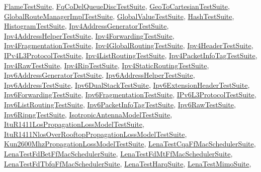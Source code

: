 \hyperlink{classFlameTestSuite}{Flame\+Test\+Suite}, \hyperlink{classFqCoDelQueueDiscTestSuite}{Fq\+Co\+Del\+Queue\+Disc\+Test\+Suite}, \hyperlink{classGeoToCartesianTestSuite}{Geo\+To\+Cartesian\+Test\+Suite}, \hyperlink{classGlobalRouteManagerImplTestSuite}{Global\+Route\+Manager\+Impl\+Test\+Suite}, \hyperlink{classGlobalValueTestSuite}{Global\+Value\+Test\+Suite}, \hyperlink{classHashTestSuite}{Hash\+Test\+Suite}, \hyperlink{classHistogramTestSuite}{Histogram\+Test\+Suite}, \hyperlink{classIpv4AddressGeneratorTestSuite}{Ipv4\+Address\+Generator\+Test\+Suite}, \hyperlink{classIpv4AddressHelperTestSuite}{Ipv4\+Address\+Helper\+Test\+Suite}, \hyperlink{classIpv4ForwardingTestSuite}{Ipv4\+Forwarding\+Test\+Suite}, \hyperlink{classIpv4FragmentationTestSuite}{Ipv4\+Fragmentation\+Test\+Suite}, \hyperlink{classIpv4GlobalRoutingTestSuite}{Ipv4\+Global\+Routing\+Test\+Suite}, \hyperlink{classIpv4HeaderTestSuite}{Ipv4\+Header\+Test\+Suite}, \hyperlink{classIPv4L3ProtocolTestSuite}{I\+Pv4\+L3\+Protocol\+Test\+Suite}, \hyperlink{classIpv4ListRoutingTestSuite}{Ipv4\+List\+Routing\+Test\+Suite}, \hyperlink{classIpv4PacketInfoTagTestSuite}{Ipv4\+Packet\+Info\+Tag\+Test\+Suite}, \hyperlink{classIpv4RawTestSuite}{Ipv4\+Raw\+Test\+Suite}, \hyperlink{classIpv4RipTestSuite}{Ipv4\+Rip\+Test\+Suite}, \hyperlink{classIpv4StaticRoutingTestSuite}{Ipv4\+Static\+Routing\+Test\+Suite}, \hyperlink{classIpv6AddressGeneratorTestSuite}{Ipv6\+Address\+Generator\+Test\+Suite}, \hyperlink{classIpv6AddressHelperTestSuite}{Ipv6\+Address\+Helper\+Test\+Suite}, \hyperlink{classIpv6AddressTestSuite}{Ipv6\+Address\+Test\+Suite}, \hyperlink{classIpv6DualStackTestSuite}{Ipv6\+Dual\+Stack\+Test\+Suite}, \hyperlink{classIpv6ExtensionHeaderTestSuite}{Ipv6\+Extension\+Header\+Test\+Suite}, \hyperlink{classIpv6ForwardingTestSuite}{Ipv6\+Forwarding\+Test\+Suite}, \hyperlink{classIpv6FragmentationTestSuite}{Ipv6\+Fragmentation\+Test\+Suite}, \hyperlink{classIPv6L3ProtocolTestSuite}{I\+Pv6\+L3\+Protocol\+Test\+Suite}, \hyperlink{classIpv6ListRoutingTestSuite}{Ipv6\+List\+Routing\+Test\+Suite}, \hyperlink{classIpv6PacketInfoTagTestSuite}{Ipv6\+Packet\+Info\+Tag\+Test\+Suite}, \hyperlink{classIpv6RawTestSuite}{Ipv6\+Raw\+Test\+Suite}, \hyperlink{classIpv6RipngTestSuite}{Ipv6\+Ripng\+Test\+Suite}, \hyperlink{classIsotropicAntennaModelTestSuite}{Isotropic\+Antenna\+Model\+Test\+Suite}, \hyperlink{classItuR1411LosPropagationLossModelTestSuite}{Itu\+R1411\+Los\+Propagation\+Loss\+Model\+Test\+Suite}, \hyperlink{classItuR1411NlosOverRooftopPropagationLossModelTestSuite}{Itu\+R1411\+Nlos\+Over\+Rooftop\+Propagation\+Loss\+Model\+Test\+Suite}, \hyperlink{classKun2600MhzPropagationLossModelTestSuite}{Kun2600\+Mhz\+Propagation\+Loss\+Model\+Test\+Suite}, \hyperlink{classLenaTestCqaFfMacSchedulerSuite}{Lena\+Test\+Cqa\+Ff\+Mac\+Scheduler\+Suite}, \hyperlink{classLenaTestFdBetFfMacSchedulerSuite}{Lena\+Test\+Fd\+Bet\+Ff\+Mac\+Scheduler\+Suite}, \hyperlink{classLenaTestFdMtFfMacSchedulerSuite}{Lena\+Test\+Fd\+Mt\+Ff\+Mac\+Scheduler\+Suite}, \hyperlink{classLenaTestFdTbfqFfMacSchedulerSuite}{Lena\+Test\+Fd\+Tbfq\+Ff\+Mac\+Scheduler\+Suite}, \hyperlink{classLenaTestHarqSuite}{Lena\+Test\+Harq\+Suite}, \hyperlink{classLenaTestMimoSuite}{Lena\+Test\+Mimo\+Suite}, 